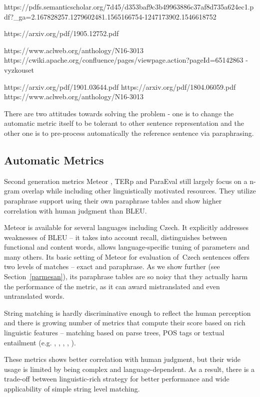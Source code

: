 \documentclass[11pt]{article}
\def\Sref#1{Section~\ref{#1}}
\begin{document}
https://pdfs.semanticscholar.org/7d45/d353baf9c3b49963886c37af8d735a624ec1.pdf?_ga=2.167828257.1279602481.1565166754-1247173902.1546618752


https://arxiv.org/pdf/1905.12752.pdf
\cite{roy2019}

https://www.aclweb.org/anthology/N16-3013
\cite{napoles-etal-2016-sentential}
https://cwiki.apache.org/confluence/pages/viewpage.action?pageId=65142863 - vyzkouset

https://arxiv.org/pdf/1901.03644.pdf
https://arxiv.org/pdf/1804.06059.pdf
https://www.aclweb.org/anthology/N16-3013

There are two attitudes towards solving the problem - one is to change the 
automatic metric itself to be tolerant to other sentence representation and the
other one is to pre-process automatically the reference sentence via 
paraphrasing.

\subsection{Automatic Metrics}
Second generation metrics Meteor \cite{meteor-wmt:2014}, TERp \cite{terp} and 
ParaEval \cite{paraeval2} still largely focus on a n-gram overlap while 
including other linguistically motivated resources. They utilize paraphrase 
support using their own paraphrase tables and show higher correlation with 
human judgment than BLEU.


Meteor is available for several languages including Czech. It explicitly 
addresses weaknesses of BLEU -- it takes into account recall, distinguishes 
between functional and content words, allows language-specific tuning of 
parameters and many others. Its  basic setting of Meteor for evaluation 
of~Czech sentences offers two levels of matches -- exact and paraphrase. As we 
show further (see \Sref{parmesan}), its paraphrase tables are so noisy that 
they actually harm the performance of the metric, as it can award mistranslated 
and even untranslated words.

String matching is hardly discriminative enough to reflect the human perception 
and there is growing number of metrics that compute their score based on rich 
linguistic features -- matching based on parse trees, POS tags or textual 
entailment (e.g. , , 
, , ). 

These metrics shows better correlation with human judgment, but their wide 
usage is limited by being complex and language-dependent. As a result, there is
a trade-off between linguistic-rich strategy for better performance and 
wide applicability of simple string level matching.
\end{document}
